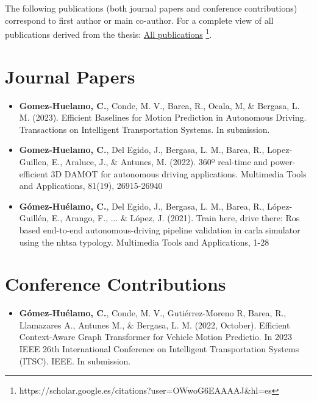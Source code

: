 \begin{refsection}

The following publications (both journal papers and conference contributions) correspond to first author or main co-author. For a complete view of all publications derived from the thesis: \href{https://scholar.google.es/citations?user=OWwoG6EAAAAJ\&hl=es}{All publications} \footnote{https://scholar.google.es/citations?user=OWwoG6EAAAAJ\&hl=es}.

\section*{Journal Papers}

\begin{itemize}

\item \textbf{Gomez-Huelamo, C.}, Conde, M. V., Barea, R., Ocala, M, \& Bergasa, L. M. (2023). Efficient Baselines for Motion Prediction in Autonomous Driving. Transactions on Intelligent Transportation Systems. In submission.

\item \textbf{Gomez-Huelamo, C.}, Del Egido, J., Bergasa, L. M., Barea, R., Lopez-Guillen, E., Araluce, J., \& Antunes, M. (2022). 360º real-time and power-efficient 3D DAMOT for autonomous driving applications. Multimedia Tools and Applications, 81(19), 26915-26940

\item \textbf{Gómez-Huélamo, C.}, Del Egido, J., Bergasa, L. M., Barea, R., López-Guillén, E., Arango, F., ... \& López, J. (2021). Train here, drive there: Ros based end-to-end autonomous-driving pipeline validation in carla simulator using the nhtsa typology. Multimedia Tools and Applications, 1-28

\end{itemize}

\section*{Conference Contributions}

\begin{itemize}

\item \textbf{Gómez-Huélamo, C.}, Conde, M. V., Gutiérrez-Moreno R, Barea, R., Llamazares A., Antunes M., \& Bergasa, L. M. (2022, October). Efficient Context-Aware Graph Transformer for Vehicle Motion Predictio. In 2023 IEEE 26th International Conference on Intelligent Transportation Systems (ITSC). IEEE. In submission.


\end{itemize}
\end{refsection}

